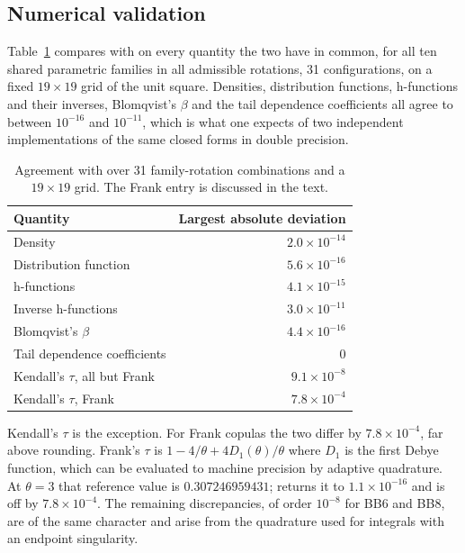 \documentclass[article]{jss}
\begin{document}
\subsection{Numerical validation}\label{sec:validation}

Table~\ref{tab:validation} compares  with 
on every quantity the two have in common, for all ten shared parametric
families in all admissible rotations, 31 configurations, on a fixed
$19 \times 19$ grid of the unit square.  Densities, distribution functions,
h-functions and their inverses, Blomqvist's $\beta$ and the tail dependence
coefficients all agree to between $10^{-16}$ and $10^{-11}$, which is what one
expects of two independent implementations of the same closed forms in double
precision.

\begin{table}[t!]
\centering
\begin{tabular}{lr}
\toprule
Quantity & Largest absolute deviation \\
\midrule
Density                                & $2.0 \times 10^{-14}$ \\
Distribution function                  & $5.6 \times 10^{-16}$ \\
h-functions                            & $4.1 \times 10^{-15}$ \\
Inverse h-functions                    & $3.0 \times 10^{-11}$ \\
Blomqvist's $\beta$                    & $4.4 \times 10^{-16}$ \\
Tail dependence coefficients           & $0$ \\
Kendall's $\tau$, all but Frank        & $9.1 \times 10^{-8}$ \\
Kendall's $\tau$, Frank                & $7.8 \times 10^{-4}$ \\
\bottomrule
\end{tabular}
\caption{Agreement with  over 31 family-rotation combinations
and a $19 \times 19$ grid.  The Frank entry is discussed in the text.}
\label{tab:validation}
\end{table}

Kendall's $\tau$ is the exception.  For Frank copulas the two differ by
$7.8 \times 10^{-4}$, far above rounding.  Frank's $\tau$ is
$1 - 4/\theta + 4 D_1(\theta)/\theta$ where $D_1$ is the first Debye function,
which can be evaluated to machine precision by adaptive quadrature.  At
$\theta = 3$ that reference value is $0.307246959431$; 
returns it to $1.1 \times 10^{-16}$ and  is off by
$7.8 \times 10^{-4}$.  The remaining discrepancies, of order $10^{-8}$ for BB6
and BB8, are of the same character and arise from the quadrature used for
integrals with an endpoint singularity.
\end{document}
